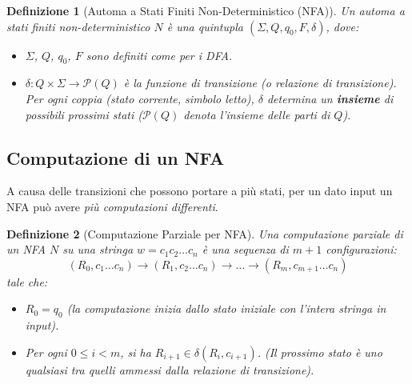 \documentclass[a4paper]{article}
\newtheorem{definition}{Definizione}[section]
\begin{document}
\begin{definition}[Automa a Stati Finiti Non-Deterministico (NFA)]
Un automa a stati finiti non-deterministico $N$ è una quintupla $( \Sigma, Q, q_0, F, \delta )$, dove:
\begin{itemize}
    \item $\Sigma$, $Q$, $q_0$, $F$ sono definiti come per i DFA.
    \item $\delta: Q \times \Sigma \to \mathcal{P}(Q)$ è la funzione di transizione (o relazione di transizione). Per ogni coppia (stato corrente, simbolo letto), $\delta$ determina un \textbf{insieme} di possibili prossimi stati ($\mathcal{P}(Q)$ denota l'insieme delle parti di $Q$).
\end{itemize}
\end{definition}

\subsection{Computazione di un NFA}
A causa delle transizioni che possono portare a più stati, per un dato input un NFA può avere \emph{più computazioni differenti}.

\begin{definition}[Computazione Parziale per NFA]
Una \emph{computazione parziale} di un NFA $N$ su una stringa $w = c_1 c_2 \dots c_n$ è una sequenza di $m+1$ configurazioni:
\[ (R_0, c_1 \dots c_n) \xrightarrow{} (R_1, c_2 \dots c_n) \xrightarrow{} \dots \xrightarrow{} (R_m, c_{m+1} \dots c_n) \]
tale che:
\begin{itemize}
    \item $R_0 = q_0$ (la computazione inizia dallo stato iniziale con l'intera stringa in input).
    \item Per ogni $0 \leq i < m$, si ha $R_{i+1} \in \delta(R_i, c_{i+1})$. (Il prossimo stato è uno qualsiasi tra quelli ammessi dalla relazione di transizione).
\end{itemize}
\end{definition}
\end{document}
